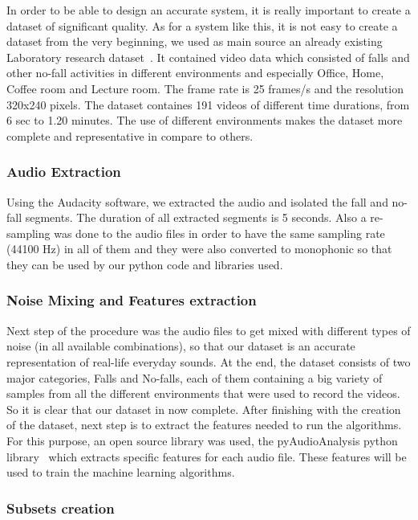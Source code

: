 \documentclass[10pt, conference, compsocconf]{IEEEtran}
\begin{document}
In order to be able to design an accurate system, it is really important to create a dataset of significant quality. As for a system like this, it is not easy to create a dataset from the very beginning, we used as main source an already existing Laboratory research dataset~\cite{Dataset}. It contained video data which consisted of falls and other no-fall activities in different environments and especially Office, Home, Coffee room and Lecture room. The frame rate is 25 frames/s and the resolution 320x240 pixels. The dataset containes 191 videos of different time durations, from 6 sec to 1.20 minutes. The use of different environments makes the dataset more complete and representative in compare to others.  

\subsubsection{Audio Extraction}

Using the Audacity software, we extracted the audio and isolated the fall and no-fall segments. The duration of all extracted segments is 5 seconds. Also a re-sampling was done to the audio files in order to have the same sampling rate (44100 Hz) in all of them and they were also converted to monophonic so that they can be used by our python code and libraries used.

\subsubsection{Noise Mixing and Features extraction}

Next step of the procedure was the audio files to get mixed with different types of noise (in all available combinations), so that our dataset is an accurate representation of real-life everyday sounds. At the end, the dataset consists of two major categories, Falls and No-falls, each of them containing a big variety of samples from all the different environments that were used to record the videos. So it is clear that our dataset in now complete. After finishing with the creation of the dataset, next step is to extract the features needed to run the algorithms. For this purpose, an open source library was used, the pyAudioAnalysis python library~\cite{giannakopoulos2015pyaudioanalysis} which extracts specific features for each audio file. These features will be used to train the machine learning algorithms.

\subsubsection{Subsets creation}
\end{document}
